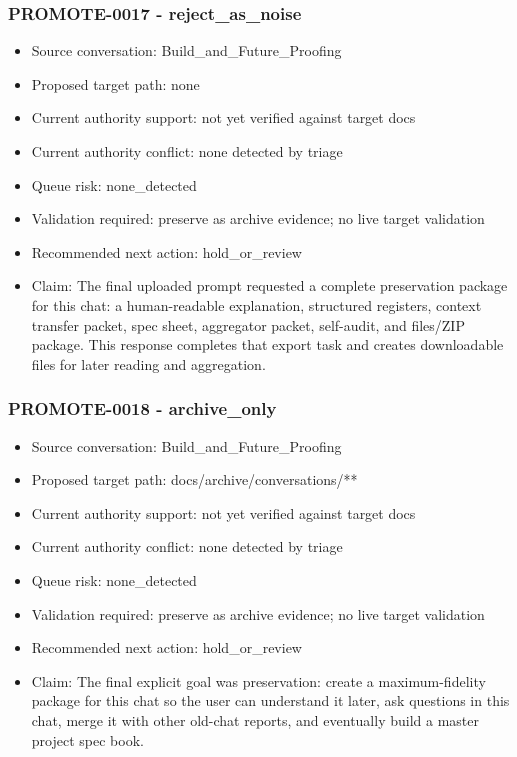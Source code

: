 \documentclass[11pt,a4paper]{report}
\begin{document}
\subsubsection{PROMOTE-0017 - reject\_as\_noise}

\begin{itemize}
\item Source conversation: Build\_and\_Future\_Proofing
\item Proposed target path: none
\item Current authority support: not yet verified against target docs
\item Current authority conflict: none detected by triage
\item Queue risk: none\_detected
\item Validation required: preserve as archive evidence; no live target validation
\item Recommended next action: hold\_or\_review
\item Claim: The final uploaded prompt requested a complete preservation package for this chat: a human-readable explanation, structured registers, context transfer packet, spec sheet, aggregator packet, self-audit, and files/ZIP package. This response completes that export task and creates downloadable files for later reading and aggregation.
\end{itemize}

\subsubsection{PROMOTE-0018 - archive\_only}

\begin{itemize}
\item Source conversation: Build\_and\_Future\_Proofing
\item Proposed target path: docs/archive/conversations/**
\item Current authority support: not yet verified against target docs
\item Current authority conflict: none detected by triage
\item Queue risk: none\_detected
\item Validation required: preserve as archive evidence; no live target validation
\item Recommended next action: hold\_or\_review
\item Claim: The final explicit goal was preservation: create a maximum-fidelity package for this chat so the user can understand it later, ask questions in this chat, merge it with other old-chat reports, and eventually build a master project spec book.
\end{itemize}
\end{document}

